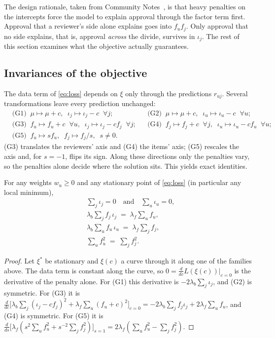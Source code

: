 The design rationale, taken from Community Notes~\cite{wojcik2022birdwatch}, is that heavy
penalties on the intercepts force the model to explain approval through the factor term first.
Approval that a reviewer's side alone explains goes into $f_uf_j$. Only approval that no side
explains, that is, approval \emph{across} the divide, survives in $\iota_j$. The rest of this
section examines what the objective actually guarantees.

\subsection{Invariances of the objective}

The data term of \eqref{eq:loss} depends on $\xi$ only through the predictions
$\hat r_{uj}$. Several transformations leave every prediction unchanged:
\begin{align*}
  &\text{(G1)}\;\; \mu\mapsto\mu+c,\;\; \iota_j\mapsto\iota_j-c\;\;\forall j;
  &&\text{(G2)}\;\; \mu\mapsto\mu+c,\;\; \iota_u\mapsto\iota_u-c\;\;\forall u;\\
  &\text{(G3)}\;\; f_u\mapsto f_u+c\;\;\forall u,\;\; \iota_j\mapsto\iota_j-c f_j\;\;\forall j;
  &&\text{(G4)}\;\; f_j\mapsto f_j+c\;\;\forall j,\;\; \iota_u\mapsto\iota_u-c f_u\;\;\forall u;\\
  &\text{(G5)}\;\; f_u\mapsto s f_u,\;\; f_j\mapsto f_j/s,\;\; s\neq0.
\end{align*}
(G3) translates the reviewers' axis and (G4) the items' axis; (G5) rescales the axis and, for
$s=-1$, flips its sign. Along these directions only the penalties vary, so the penalties alone
decide where the solution sits. This yields exact identities.

\begin{lemma}\label{lem:gauge}\proved{}
For any weights $w_u\ge0$ and any stationary point of \eqref{eq:loss} (in particular any local
minimum),
\begin{align}
  &\textstyle\sum_j \iota_j = 0 \quad\text{and}\quad \sum_u \iota_u = 0, \label{eq:zerosum}\\
  &\textstyle\lambda_b\sum_j f_j\,\iota_j \;=\; \lambda_f\sum_u f_u, \label{eq:gauge-rev}\\
  &\textstyle\lambda_b\sum_u f_u\,\iota_u \;=\; \lambda_f\sum_j f_j, \label{eq:gauge-item}\\
  &\textstyle\sum_u f_u^2 \;=\; \sum_j f_j^2. \label{eq:scale}
\end{align}
\end{lemma}
\begin{proof}
Let $\xi^*$ be stationary and $\xi(c)$ a curve through it along one of the families above. The
data term is constant along the curve, so $0=\frac{d}{dc}L(\xi(c))|_{c=0}$ is the derivative of
the penalty alone. For (G1) this derivative is $-2\lambda_b\sum_j\iota_j$, and (G2) is
symmetric. For (G3) it is
$\frac{d}{dc}\bigl[\lambda_b\sum_j(\iota_j-cf_j)^2+\lambda_f\sum_u(f_u+c)^2\bigr]_{c=0}
=-2\lambda_b\sum_j f_j\iota_j+2\lambda_f\sum_u f_u$, and (G4) is symmetric. For (G5) it is
$\frac{d}{ds}\bigl[\lambda_f(s^2\sum_u f_u^2+s^{-2}\sum_j f_j^2)\bigr]_{s=1}
=2\lambda_f(\sum_u f_u^2-\sum_j f_j^2)$.
\end{proof}

